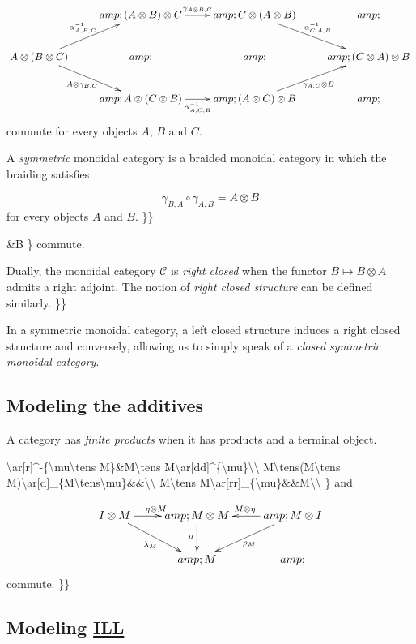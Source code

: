 \[\xymatrix{
&amp;(A\otimes B)\otimes C\ar[r]^{\gamma_{A\otimes B,C}}&amp;C\otimes (A\otimes B)\ar[dr]^{\alpha^{-1}_{C,A,B}}&amp;\\
A\otimes (B\otimes C)\ar[ur]^{\alpha^{-1}_{A,B,C}}\ar[dr]_{A\otimes\gamma_{B,C}}&amp;&amp;&amp;(C\otimes A)\otimes B\\
&amp;A\otimes(C\otimes B)\ar[r]_{\alpha^{-1}_{A,C,B}}&amp;(A\otimes C)\otimes B\ar[ur]_{\gamma_{A,C}\otimes B}&amp;\\
}\] commute for every objects \(A\), \(B\) and \(C\).

A \emph{symmetric} monoidal category is a braided monoidal category in
which the braiding satisfies

\[\gamma_{B,A}\circ\gamma_{A,B}=A\otimes B\] for every objects \(A\) and
\(B\). \}\}

\&B \} commute.

Dually, the monoidal category \(\mathcal{C}\) is \emph{right closed}
when the functor \(B\mapsto B\otimes A\) admits a right adjoint. The
notion of \emph{right closed structure} can be defined similarly. \}\}

In a symmetric monoidal category, a left closed structure induces a
right closed structure and conversely, allowing us to simply speak of a
\emph{closed symmetric monoidal category}.

\subsection{Modeling the additives}\label{modeling-the-additives}

A category has \emph{finite products} when it has products and a
terminal object.

\textbackslash{}ar{[}r{]}\^{}-\{\textbackslash{}mu\textbackslash{}tens
M\}\&M\textbackslash{}tens
M\textbackslash{}ar{[}dd{]}\^{}\{\textbackslash{}mu\}\textbackslash{}\textbackslash{}
M\textbackslash{}tens(M\textbackslash{}tens
M)\textbackslash{}ar{[}d{]}\_\{M\textbackslash{}tens\textbackslash{}mu\}\&\&\textbackslash{}\textbackslash{}
M\textbackslash{}tens
M\textbackslash{}ar{[}rr{]}\_\{\textbackslash{}mu\}\&\&M\textbackslash{}\textbackslash{}
\} and

\[\xymatrix{
I\tens M\ar[r]^{\eta\tens M}\ar[dr]_{\lambda_M}&amp;M\tens M\ar[d]_\mu&amp;\ar[l]_{M\tens\eta}\ar[dl]^{\rho_M}M\tens I\\
&amp;M&amp;
}\] commute. \}\}

\subsection{\texorpdfstring{Modeling \url{ILL}}{Modeling ILL}}\label{modeling-ill}

